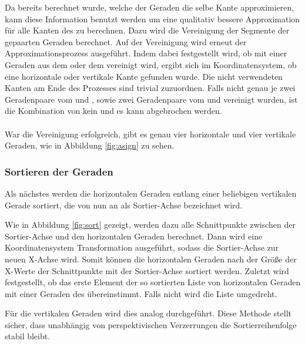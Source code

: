 Da bereits berechnet wurde, welche der Geraden die selbe Kante approximieren, kann diese Information benutzt werden um eine qualitativ bessere Approximation für alle Kanten des \olfps zu berechnen. Dazu wird die Vereinigung der Segmente der gepaarten Geraden berechnet. Auf der Vereinigung wird erneut der Approximationsprozess ausgeführt. 
Indem dabei festgestellt wird, ob mit einer Geraden aus dem \orfpn oder dem \ulfpn vereinigt wird, ergibt sich im \QRCode Koordinatensystem, ob eine horizontale oder vertikale Kante gefunden wurde. Die nicht verwendeten Kanten am Ende des Prozesses sind trivial zuzuordnen. Falls nicht genau je zwei Geradenpaare vom \olfpn und \orfpn, sowie zwei Geradenpaare vom \olfpn und \ulfpn vereinigt wurden, ist die Kombination von \fps kein \QRCode und es kann abgebrochen werden.
\\\\
War die Vereinigung erfolgreich, gibt es genau vier horizontale und vier vertikale Geraden, wie in Abbildung \ref{fig:asign} zu sehen.

\subsubsection{Sortieren der Geraden}
Als nächstes werden die horizontalen Geraden entlang einer beliebigen vertikalen Gerade sortiert, die von nun an als Sortier-Achse bezeichnet wird.

Wie in Abbildung \ref{fig:sort} gezeigt, werden dazu alle Schnittpunkte zwischen der Sortier-Achse und den horizontalen Geraden berechnet. Dann wird eine Koordinatensystem Transformation ausgeführt, sodass die Sortier-Achse zur neuen X-Achse wird. Somit können die horizontalen Geraden nach der Größe der X-Werte der Schnittpunkte mit der Sortier-Achse sortiert werden. Zuletzt wird festgestellt, ob das erste Element der so sortierten Liste von horizontalen Geraden mit einer Geraden des \olfps übereinstimmt. Falls nicht wird die Liste umgedreht.

Für die vertikalen Geraden wird dies analog durchgeführt. Diese Methode stellt sicher, dass unabhängig von perspektivischen Verzerrungen die Sortierreihenfolge stabil bleibt.


